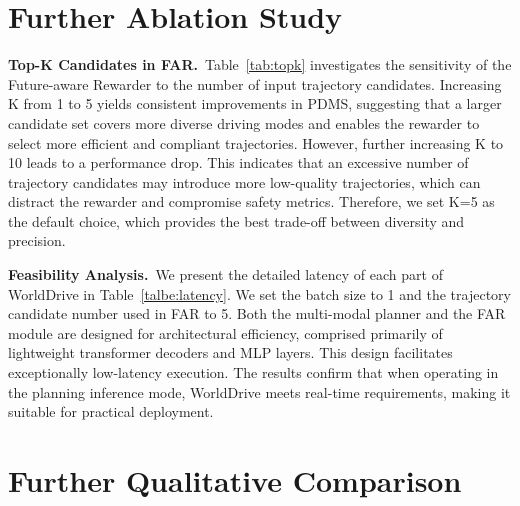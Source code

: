 \section{Further Ablation Study}
\noindent\textbf{Top-K Candidates in FAR.}~Table~\ref{tab:topk} investigates the sensitivity of the Future-aware Rewarder to the number of input trajectory candidates. Increasing K from 1 to 5 yields consistent improvements in PDMS, suggesting that a larger candidate set covers more diverse driving modes and enables the rewarder to select more efficient and compliant trajectories.
However, further increasing K to 10 leads to a performance drop. This indicates that an excessive number of trajectory candidates may introduce more low-quality trajectories, which can distract the rewarder and compromise safety metrics. Therefore, we set K=5 as the default choice, which provides the best trade-off between diversity and precision.


\noindent\textbf{Feasibility Analysis.}~We present the detailed latency of each part of WorldDrive in Table~\ref{talbe:latency}. We set the batch size to 1 and the trajectory candidate number used in FAR to 5. Both the multi-modal planner and the FAR module are designed for architectural efficiency, comprised primarily of lightweight transformer decoders and MLP layers. This design facilitates exceptionally low-latency execution.  The results confirm that when operating in the planning inference mode, WorldDrive meets real-time requirements, making it suitable for practical deployment.

\begin{table}[t]
    \centering
    \setlength{\tabcolsep}{9.5pt}
\caption{\textbf{Inference latency comparison}. Latency is measured on a single NVIDIA A800 GPU for the full forward pipeline of WorldDrive. ``Encoders'' include the 3D Causal VAE, visual adapter, and trajectory encoder.}
\label{talbe:latency}
\vspace{-5mm}
\end{table}


\section{Further Qualitative Comparison}

